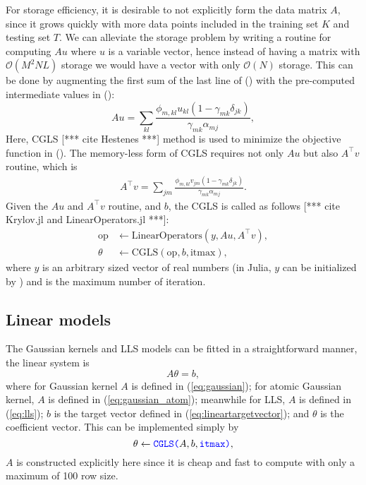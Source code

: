 \documentclass[12pt]{article}
\def\att{                    %
        \marginpar[ \hspace*{\fill} \raisebox{-0.2em}{\rule{2mm}{1.2em}} ]
        {\raisebox{-0.2em}{\rule{2mm}{1.2em}} }
        }
\def\at#1{[*** \att #1 ***]}  %
\begin{document}
For storage efficiency, it is desirable to not explicitly form the data matrix $A$, since it grows quickly with more data points included in the training set $K$ and testing set $T$. 
We can alleviate the storage problem by writing a routine for computing $Au$ where $u$ is a variable vector, hence instead of having a matrix with $\mathcal{O}(M^2NL)$ storage we would have a vector with only $\mathcal{O}(N)$ storage. 
This can be done by augmenting the first sum of the last line of () with the pre-computed intermediate values in ():
\begin{equation}
	Au = \sum_{kl} \frac{\phi_{m, kl} u_{kl} (1-\gamma_{m k}\delta_{jk})}{\gamma_{mk}\alpha_{mj}},
\end{equation}
Here, CGLS \at{cite Hestenes} method is used to minimize the objective function in (). The memory-less form of CGLS requires not only $Au$ but also $A^\top v$ routine, which is
\begin{equation}
	\begin{split}
		A^\top v = \sum_{jm} \frac{\phi_{m, kl} v_{jm} (1-\gamma_{m k}\delta_{jk})}{\gamma_{mk}\alpha_{mj}}.
	\end{split}
\end{equation}
Given the $Au$ and $A^\top v$ routine, and $b$, the CGLS is called as follows \at{cite Krylov.jl and LinearOperators.jl}:
\begin{equation*}
	\begin{split}
		\text{op} &\leftarrow \text{LinearOperators}(y, Au, A^\top v), \\
		\theta &\leftarrow \text{CGLS}(\text{op}, b, \text{itmax}),
	\end{split}
\end{equation*}
where $y$ is an arbitrary sized vector of real numbers (in Julia, $y$ can be initialized by ) and  is the maximum number of iteration.
\subsection{Linear models}
The Gaussian kernels and LLS models can be fitted in a straightforward manner, the linear system is
\begin{equation}
	A \theta = b,
\end{equation}
where for Gaussian kernel $A$ is defined in (\ref{eq:gaussian}); for atomic Gaussian kernel, $A$ is defined in (\ref{eq:gaussian_atom}); meanwhile for LLS, $A$ is defined in (\ref{eq:lls}); $b$ is the target vector defined in (\ref{eq:lineartargetvector}); and $\theta$ is the coefficient vector. This can be implemented simply by
\begin{equation*}
	\theta \leftarrow \codeword{CGLS(}A, b,\codeword{itmax)},
\end{equation*}
$A$ is constructed explicitly here since it is cheap and fast to compute with only a maximum of 100 row size.
\end{document}
